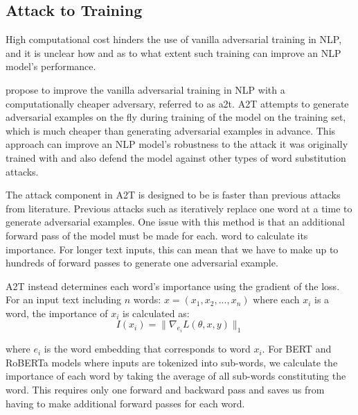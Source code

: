 \subsection{Attack to Training}\label{subsec:a2t}
High computational cost hinders the use of vanilla adversarial training in NLP, and it is unclear how and as to what extent such training can improve an NLP model's performance.

\cite{https://doi.org/10.48550/arxiv.2109.00544} propose to improve the vanilla
adversarial training in NLP with a computationally cheaper adversary, referred to as \acrfull{a2t}. 
A2T attempts to generate adversarial examples on the fly during training of the model on the training set, which is much cheaper than generating adversarial examples in advance.
This approach can improve an NLP model's robustness to the attack it was originally trained with and also defend the model against other types of word substitution attacks.

The attack component in A2T is designed to be is faster than previous attacks from literature. Previous attacks such as \cite{conf/emnlp/GargR20, journals/corr/abs-1907-11932} iteratively replace one word at a time to generate adversarial examples.
One issue with this method is that an additional
forward pass of the model must be made for each.
word to calculate its importance. For longer text inputs, this can mean that we have to make up to hundreds of forward passes to generate one adversarial example.

A2T instead determines each word's importance
using the gradient of the loss. For an input text including $n$ words: $x = (x_1, x_2, . . . , x_n)$ where each $x_i$ is a word, the importance of $x_i$ is calculated as:
\begin{equation}
    I(x_i) = \| \nabla_{e_i} L(\theta, x, y) \|_1
\end{equation}

where $e_i$ is the word embedding that corresponds to word $x_i$. For BERT and RoBERTa models where inputs are tokenized into sub-words, we calculate the importance of each word by taking the average of all sub-words constituting the word. This requires only one forward and backward
pass and saves us from having to make additional forward passes for each word.
